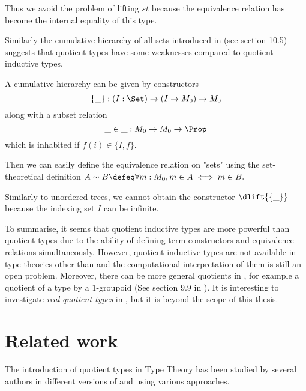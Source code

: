 Thus we avoid the problem of lifting $st$ because the equivalence
relation has become the internal equality of this type.


Similarly the cumulative hierarchy of all sets introduced in
\cite{hott} (see section 10.5) suggests that quotient types have some
weaknesses compared to quotient inductive types.

A cumulative hierarchy can be given by constructors
$$\{\_\} : (I : \Set) \to (I \to M_0) \to M_0$$
along with a subset relation
$$\_\in\_ : M_0 \to M_0 \to \Prop$$
which is inhabited if $ f(i) \in \{ I , f \}$.

Then we can easily define the equivalence relation on "sets" using the
set-theoretical definition
$A \sim B \defeq \forall m : M_0, m \in A \iff m \in B.$

Similarly to unordered trees, we cannot obtain the constructor
$\dlift{\{\_\}}$ because the indexing set $I$ can be infinite.

To summarise, it seems that quotient inductive types are more powerful
than quotient types due to the ability of defining term constructors
and equivalence relations simultaneously.  However, quotient inductive
types are not available in type theories other than \hott and the
computational interpretation of them is still an open problem.
Moreover, there can be more general quotients in \hott, for example a
quotient of a type by a $1$-groupoid (See section 9.9 in
\cite{hott}). It is interesting to investigate \emph{real}
\emph{quotient types} in \hott, but it is beyond the scope of this
thesis.

\section{Related work}\label{related}

The introduction of quotient types in Type Theory has been studied by several authors in different versions of \mltt and using various approaches.

